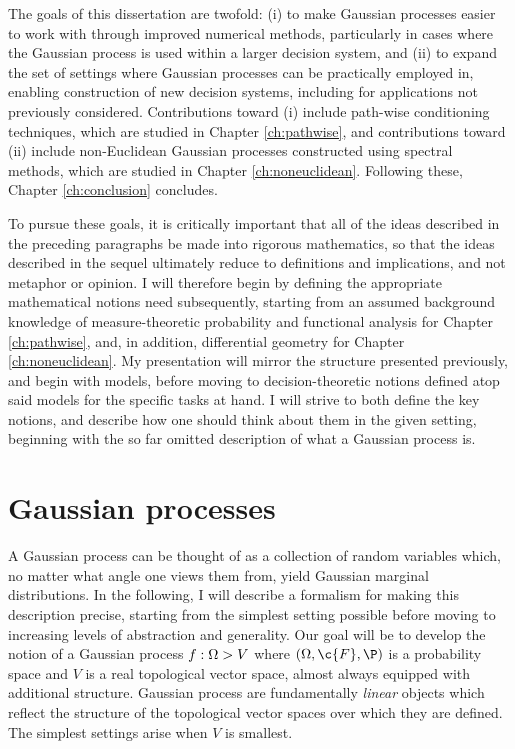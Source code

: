 \documentclass[11pt]{book}
\begin{document}
The goals of this dissertation are twofold: (i) to make Gaussian processes easier to work with through improved numerical methods, particularly in cases where the Gaussian process is used within a larger decision system, and (ii) to expand the set of settings where Gaussian processes can be practically employed in, enabling construction of new decision systems, including for applications not previously considered.
Contributions toward (i) include path-wise conditioning techniques, which are studied in Chapter \ref{ch:pathwise}, and contributions toward (ii) include non-Euclidean Gaussian processes constructed using spectral methods, which are studied in Chapter \ref{ch:noneuclidean}.
Following these, Chapter \ref{ch:conclusion} concludes.

To pursue these goals, it is critically important that all of the ideas described in the preceding paragraphs be made into rigorous mathematics, so that the ideas described in the sequel ultimately reduce to definitions and implications, and not metaphor or opinion.
I will therefore begin by defining the appropriate mathematical notions need subsequently, starting from an assumed background knowledge of measure-theoretic probability and functional analysis for Chapter \ref{ch:pathwise}, and, in addition, differential geometry for Chapter \ref{ch:noneuclidean}.
My presentation will mirror the structure presented previously, and begin with models, before moving to decision-theoretic notions defined atop said models for the specific tasks at hand.
I will strive to both define the key notions, and describe how one should think about them in the given setting, beginning with the so far omitted description of what a Gaussian process is.

\section{Gaussian processes}

A Gaussian process can be thought of as a collection of random variables which, no matter what angle one views them from, yield Gaussian marginal distributions.
In the following, I will describe a formalism for making this description precise, starting from the simplest setting possible before moving to increasing levels of abstraction and generality.
Our goal will be to develop the notion of a Gaussian process $f : \Omega \-> V$ where $(\Omega,\c{F},\P)$ is a probability space and $V$ is a real topological vector space, almost always equipped with additional structure.
Gaussian process are fundamentally \emph{linear} objects which reflect the structure of the topological vector spaces over which they are defined.
The simplest settings arise when $V$ is smallest.
\end{document}
